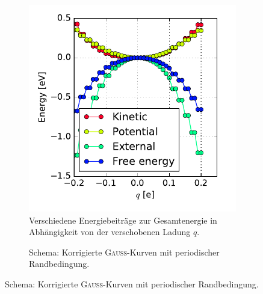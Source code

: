 \begin{frame}
\begin{figure}
\centering
\begin{subfigure}{0.45\textwidth}
\centering
\includegraphics[width = \textwidth]{Images/Hydrogen/charging/energy_contributions_symmetric}
\caption{Verschiedene Energiebeiträge zur Gesamtenergie in Abhängigkeit von der verschobenen Ladung $q$.}
\label{image_contributions_corrected}
\end{subfigure}\hspace*{1cm}
\begin{subfigure}{0.45\textwidth}
\centering
{}
\caption{Schema: Korrigierte \textsc{Gauß}-Kurven mit periodischer Randbedingung.}
\end{subfigure}
\end{figure} 
\end{frame}

